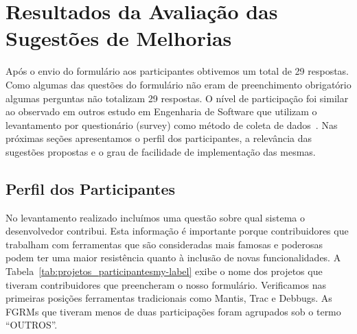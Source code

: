 \section{Resultados da Avaliação das Sugestões de Melhorias}
\label{sec:resultados_avaliacao_sug_de_melhorias}

Após o envio do formulário aos participantes obtivemos um total de 29 respostas.
Como algumas das questões do formulário não eram de preenchimento obrigatório
algumas perguntas não totalizam 29 respostas. O nível de participação foi
similar ao observado em outros estudo em Engenharia de Software que utilizam o
levantamento por questionário (survey) como método de coleta de
dados~\cite{fan2010factors}. Nas próximas seções apresentamos o perfil dos
participantes, a relevância das sugestões propostas e o grau de facilidade de
implementação das mesmas.

\subsection{Perfil dos Participantes}
\label{sub:sug_melhorias_resultados_perfil_dos_participantes}

No levantamento realizado incluímos uma questão sobre qual sistema o
desenvolvedor contribui. Esta informação é importante porque contribuidores que
trabalham com ferramentas que são consideradas mais famosas e poderosas podem
ter uma maior resistência quanto à inclusão de novas funcionalidades. A
Tabela~\ref{tab:projetos_participantesmy-label} exibe o nome dos projetos que
tiveram contribuidores que preencheram o nosso formulário. Verificamos nas
primeiras posições ferramentas tradicionais como Mantis, Trac e Debbugs. As
FGRMs que tiveram menos de duas participações foram agrupados sob o termo
``OUTROS''.

\begin{table}[htpb]
\centering
{}
\caption{Projetos que os participantes contribuem.}
\label{tab:projetos_participantesmy-label}
\end{table}

